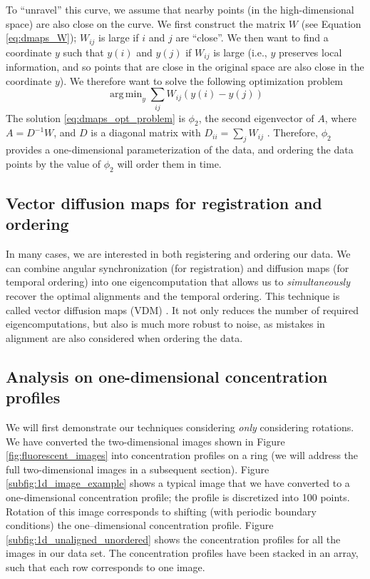 \documentclass{pnastwo}
\DeclareMathOperator*{\argmin}{arg\,min}
\begin{document}
\begin{article}
To ``unravel'' this curve, we assume that nearby points (in the high-dimensional space) are also close on the curve.
%
We first construct the matrix $W$ (see Equation \eqref{eq:dmaps_W}); $W_{ij}$ is large if $i$ and $j$ are ``close''.
%
We then want to find a coordinate $y$ such that $y(i)$ and $y(j)$ if $W_{ij}$ is large (i.e., $y$ preserves local information, and so points that are close in the original space are also close in the coordinate $y$).
%
We therefore want to solve the following optimization problem
\begin{equation} \label{eq:dmaps_opt_problem}
\argmin_{y} \sum_{ij} W_{ij} (y(i) - y(j))
\end{equation}
%
The solution \ref{eq:dmaps_opt_problem} is $\phi_2$, the second eigenvector of $A$, where $A = D^{-1} W$, and $D$ is a diagonal matrix with $D_{ii} = \sum_j W_{ij}$ \cite{...}.
%
Therefore, $\phi_2$ provides a one-dimensional parameterization of the data, and ordering the data points by the value of $\phi_2$ will order them in time.

\subsection{Vector diffusion maps for registration and ordering}

In many cases, we are interested in both registering and ordering our data.
%
%
We can combine angular synchronization (for registration) and diffusion maps (for temporal ordering) into one eigencomputation that allows us to {\em simultaneously} recover the optimal alignments and the temporal ordering.
%
This technique is called vector diffusion maps (VDM) \cite{singer2012vector}.
%
It not only reduces the number of required eigencomputations, but also is much more robust to noise, as mistakes in alignment are also considered when ordering the data.

\subsection{Analysis on one-dimensional concentration profiles}

We will first demonstrate our techniques considering {\em only} considering rotations. 
%
We have converted the two-dimensional images shown in Figure \ref{fig:fluorescent_images} into concentration profiles on a ring (we will address the full two-dimensional images in a subsequent section).
%
Figure \ref{subfig:1d_image_example} shows a typical image that we have converted to a one-dimensional concentration profile; the profile is discretized into 100 points. 
%
Rotation of this image corresponds to shifting (with periodic boundary conditions) the one--dimensional concentration profile. 
%
Figure \ref{subfig:1d_unaligned_unordered} shows the concentration profiles for all the images in our data set. 
%
The concentration profiles have been stacked in an array, such that each row corresponds to one image.


\end{article}
\end{document}
